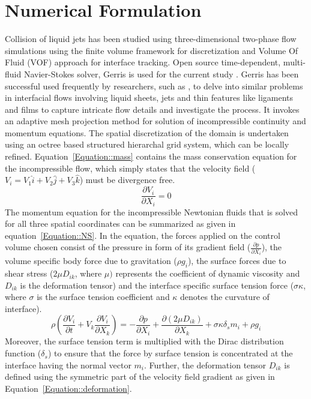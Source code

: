 \documentclass[%
aip,
sd,%
amsmath,amssymb,
preprint,%
author-year,%
]{revtex4-1}
\begin{document}
\section{Numerical Formulation}\label{Section::Numerical}
Collision of liquid jets has been studied using three-dimensional two-phase flow simulations using the finite volume framework for discretization and Volume Of Fluid (VOF) approach for interface tracking. Open source time-dependent, multi-fluid Navier-Stokes solver, Gerris is used for the current study \citep{Popinet2003}. Gerris has been successful used frequently by researchers, such as \cite{chen2013high,kumar2016physical,kumar2017bending}, to delve into similar problems in interfacial flows involving liquid sheets, jets and thin features like ligaments and films to capture intricate flow details and investigate the process. It invokes an adaptive mesh projection method for solution of incompressible continuity and momentum equations. The spatial discretization of the domain is undertaken using an octree based structured hierarchal grid system, which can be locally refined. Equation~\ref{Equation::mass} contains the mass conservation equation for the incompressible flow, which simply states that the velocity field ($V_i = V_1\hat{i} + V_2\hat{j} + V_3\hat{k}$) must be divergence free.   
\begin{equation} \label{Equation::mass}
\frac{\partial V_i}{\partial X_i} = 0
\end{equation}
The momentum equation for the incompressible Newtonian fluids that is solved for all three spatial coordinates can be summarized as given in equation~\ref{Equation::NS}. In the equation, the forces applied on the control volume chosen consist of the pressure in form of its gradient field ($\frac{\partial p}{\partial X_i}$), the volume specific body force due to gravitation ($\rho g_i$), the surface forces due to shear stress ($2\mu D_{ik}$, where $\mu)$ represents the coefficient of dynamic viscosity and $D_{ik}$ is the deformation tensor) and the interface specific surface tension force ($\sigma \kappa$, where $\sigma$ is the surface tension coefficient and $\kappa$ denotes the curvature of interface). 
\begin{equation} \label{Equation::NS}
\rho\left( \frac{\partial V_i}{\partial t} + V_k\frac{\partial V_i}{\partial X_k} \right) = -\frac{\partial p}{\partial X_i} + \frac{\partial (2\mu D_{ik})}{\partial X_k} + \sigma \kappa \delta_sm_i + \rho g_i
\end{equation}
Moreover, the surface tension term is multiplied with the Dirac distribution function ($\delta_s$) to ensure that the force by surface tension is concentrated at the interface having the normal vector $m_i$. Further, the deformation tensor $D_{ik}$ is defined using the symmetric part of the velocity field gradient as given in Equation~\ref{Equation::deformation}.
\end{document}
